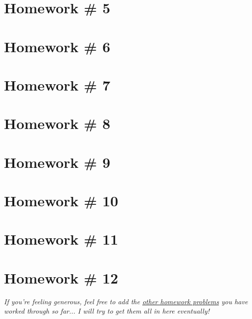 \section*{Homework \# 5}


\section*{Homework \# 6}

\section*{Homework \# 7}

\section*{Homework \# 8}

\section*{Homework \# 9}

\section*{Homework \# 10}

\section*{Homework \# 11}

\section*{Homework \# 12}

\vspace{0.35cm}
\textit{If you're feeling generous, feel free to add the \href{https://www.dropbox.com/sh/759pwsjyc3ix0jy/AADBiIq0ZkDsvyEG6fMvSxJta/Abstract\%20Algebra\%20Homework\%20Sets?dl=0&subfolder_nav_tracking=1}{other homework problems} you have worked through so far... I will try to get them all in here eventually!}